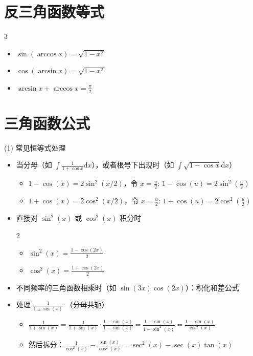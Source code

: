 \documentclass[lang=cn,math=mtpro2,10pt,scheme=chinese,black]{elegantbook}
\begin{document}
\section{反三角函数等式}

\begin{multicols}{3}
\begin{itemize}
  \item \( \displaystyle \sin(\arccos x) = \sqrt{1-x^2} \)
  \item \( \cos(\arcsin x) = \sqrt{1-x^2} \)
  \item \( \arcsin x + \arccos x = \frac{\pi}{2} \)
\end{itemize}
\end{multicols}

\section{三角函数公式}

(1) 常见恒等式处理

\begin{itemize}
  \item 当分母（如 $\int \frac{1}{1+\cos x} \mathrm{d}x$），或者根号下出现时（如 $\int \sqrt{1-\cos x} \mathrm{d}x$）
  \begin{itemize}
    \item $ \displaystyle 1-\cos(x) = 2\sin^2(x/2)$，令 $ \displaystyle x = \frac{u}{2}$: $ \displaystyle 1 - \cos(u) = 2\sin^2\left(\frac{u}{2}\right)$
    \item $ \displaystyle 1+\cos(x) = 2\cos^2(x/2)$，令 $ \displaystyle x = \frac{u}{2}$: $ \displaystyle 1 + \cos(u) = 2\cos^2\left(\frac{u}{2}\right)$
  \end{itemize}
  \item 直接对 $ \displaystyle \sin^2(x)$ 或 $\cos^2(x)$ 积分时
  \vspace{-2em}
  \begin{multicols}{2}
  \begin{itemize}
    \item $ \displaystyle \sin^2(x) = \frac{1 - \cos(2x)}{2}$
    \item $ \displaystyle \cos^2(x) = \frac{1 + \cos(2x)}{2}$
  \end{itemize}
  \end{multicols}
  \item 不同频率的三角函数相乘时（如 $\sin(3x)\cos(2x)$）：积化和差公式
  \item 处理 $ \displaystyle \frac{1}{1 \pm \sin(x)}$ （分母共轭）
  \begin{itemize}
    \item $\displaystyle \frac{1}{1 + \sin(x)} = \frac{1}{1 + \sin(x)} \cdot \frac{1 - \sin(x)}{1 - \sin(x)} = \frac{1 - \sin(x)}{1 - \sin^2(x)} = \frac{1 - \sin(x)}{\cos^2(x)}$
    \item 然后拆分：\(\displaystyle \frac{1}{\cos^2(x)} - \frac{\sin(x)}{\cos^2(x)} = \sec^2(x) - \sec(x)\tan(x)\)
  \end{itemize}
\end{itemize}
\end{document}
